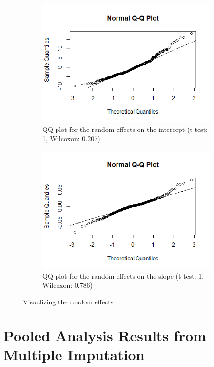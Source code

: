 \begin{figure}[H]
\begin{subfigure}{.5\textwidth}
  \centering
  \includegraphics[width=1\linewidth]{../../plots/qq_intercept.png}
  \caption{QQ plot for the random effects on the intercept (t-test: 1, Wilcoxon: 0.207)}
\end{subfigure}
\begin{subfigure}{.5\textwidth}
  \centering
  \includegraphics[width=1\linewidth]{../../plots/qq_slope.png}
  \caption{QQ plot for the random effects on the slope (t-test: 1, Wilcoxon: 0.786)}
\end{subfigure}
\caption{Visualizing the random effects}
\label{fig:re}
\end{figure}

\section{Pooled Analysis Results from Multiple Imputation}
